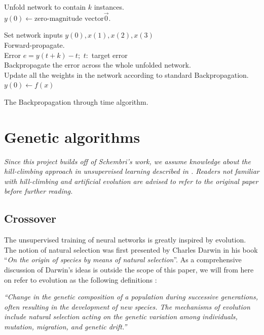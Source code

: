 \documentclass[10pt,a4paper,DIV=11]{scrreprt}
\begin{document}
 \begin{algorithm}[H]
 \LinesNumbered
 \DontPrintSemicolon
 \BlankLine
 \BlankLine
 \Begin
 {
     Unfold network to contain $k$ instances.\\
     $y(0) \leftarrow \text{zero-magnitude vector} \overrightarrow{0}$.
     
     {
         Set network inputs $y(0), x(1), x(2), x(3)$\\
         Forward-propagate.\\ 
         Error $e = y(t+k) - t;$ $t:$ target error\\
         Backpropagate the error across the whole unfolded network.\\
         Update all the weights in the network according to standard Backpropagation.\\
         $y(0) \leftarrow f(x)$
 
     
     }
 }
 \caption{The Backpropagation through time algorithm.}
 \label{alg:GD}
 \end{algorithm}
 
\section{Genetic algorithms}
\textit{Since this project builds off of Schembri's work, we assume knowledge about the hill-climbing approach in unsupervised learning described in \cite{DANIEL}. Readers not
familiar with hill-climbing and artificial evolution are advised to refer to the original paper before further reading.} 

\subsection{Crossover}
The unsupervised training of neural networks is greatly inspired by evolution. The notion of natural selection was first presented by Charles Darwin in his book 
“\textit{On the origin of species by means of natural selection}”\cite{DARWIN}.  As a comprehensive discussion of Darwin's ideas is outside the scope of this paper, 
we will from here on refer to evolution as the following definitions \cite{OXFORD}:

\begin{center}
\textit{“Change in the genetic composition of a population during successive generations, often resulting in the development of new species. The mechanisms of evolution include 
natural selection acting on the genetic variation among individuals, mutation, migration, and genetic drift.”}\\
\end{center}
\end{document}
